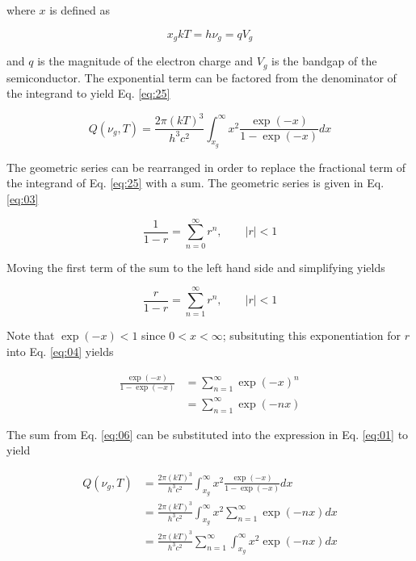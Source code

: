 \documentclass[letterpaper,12pt]{article}
\begin{document}
\noindent where $x$ is defined as

\begin{equation} \label{eq:02}
x_{g}kT = h \nu_{g} = q V_{g}
\end{equation}

\noindent and $q$ is the magnitude of the electron charge and $V_{g}$ is the bandgap of the semiconductor. The exponential term can be factored from the denominator of the integrand to yield Eq. \ref{eq:25}

\begin{equation} \label{eq:25}
Q(\nu_{g}, T) = \frac{2\pi (kT)^{3}}{h^{3} c^{2}} \int_{x_{g}}^{\infty} x^{2} \frac{\exp(-x)}{1 - \exp(-x)} dx
\end{equation}

The geometric series can be rearranged in order to replace the fractional term of the integrand of Eq. \ref{eq:25} with a sum. The geometric series is given in Eq. \ref{eq:03}

\begin{equation} \label{eq:03}
\frac{1}{1-r} = \sum_{n = 0}^{\infty} r^{n}, \qquad |r| < 1
\end{equation}

\noindent Moving the first term of the sum to the left hand side and simplifying yields

\begin{equation} \label{eq:04}
\frac{r}{1-r} = \sum_{n = 1}^{\infty} r^{n}, \qquad |r| < 1
\end{equation}

\noindent Note that $\exp(-x) < 1$ since $0 < x < \infty$; subsituting this exponentiation for $r$ into Eq. \ref{eq:04} yields

\begin{align} \label{eq:06}
\frac{\exp(-x)}{1 - \exp(-x)} &= \sum_{n = 1}^{\infty} \exp(-x)^{n} \\
 &= \sum_{n = 1}^{\infty} \exp(-nx)
\end{align}

The sum from Eq. \ref{eq:06} can be substituted into the expression in Eq. \ref{eq:01} to yield

\begin{align} \label{eq:07}
Q(\nu_{g}, T) &= \frac{2\pi (kT)^{3}}{h^{3} c^{2}} \int_{x_{g}}^{\infty} x^{2} \frac{\exp(-x)}{1 - \exp(-x)} dx \\
 &= \frac{2\pi (kT)^{3}}{h^{3} c^{2}} \int_{x_{g}}^{\infty} x^{2} \sum_{n = 1}^{\infty} \exp(-nx) dx \\
 &= \frac{2\pi (kT)^{3}}{h^{3} c^{2}} \sum_{n = 1}^{\infty} \int_{x_{g}}^{\infty} x^{2} \exp(-nx) dx
\end{align}
\end{document}

